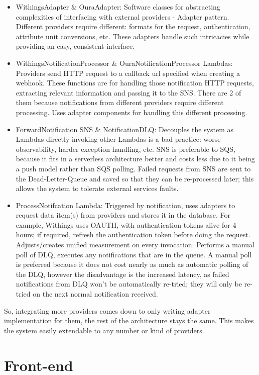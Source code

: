 \begin{itemize}
    \item {WithingsAdapter \& OuraAdapter: Software classes for abstracting complexities of interfacing with external providers - Adapter pattern. Different providers require different: formats for the request, authentication, attribute unit conversions, etc. These adapters handle such intricacies while providing an easy, consistent interface.}
    \item {WithingsNotificationProcessor \& OuraNotificationProcessor Lambdas: Providers send HTTP request to a callback url specified when creating a webhook. These functions are for handling those notification HTTP requests, extracting relevant information and passing it to the SNS. There are 2 of them because notifications from different providers require different processing. Uses adapter components for handling this different processing.}
    \item {ForwardNotification SNS \& NotificationDLQ: Decouples the system as Lambdas directly invoking other Lambdas is a bad practice: worse observability, harder exception handling, etc. SNS is preferable to SQS, because it fits in a serverless architecture better and costs less due to it being a push model rather than SQS polling. Failed requests from SNS are sent to the Dead-Letter-Queue and saved so that they can be re-processed later; this allows the system to tolerate external services faults.}
    \item {ProcessNotifcation Lambda: Triggered by notification, uses adapters to request data item(s) from providers and stores it in the database. For example, Withings uses OAUTH, with authentication tokens alive for 4 hours; if required, refresh the authentication token before doing the request. Adjusts/creates unified measurement on every invocation. Performs a manual poll of DLQ, executes any notifications that are in the queue. A manual poll is preferred because it does not cost nearly as much as automatic polling of the DLQ, however the disadvantage is the increased latency, as failed notifications from DLQ won't be automatically re-tried; they will only be re-tried on the next normal notification received. }
\end{itemize}
So, integrating more providers comes down to only writing adapter implementation for them, the rest of the architecture stays the same. This makes the system easily extendable to any number or kind of providers.
\section{Front-end}
